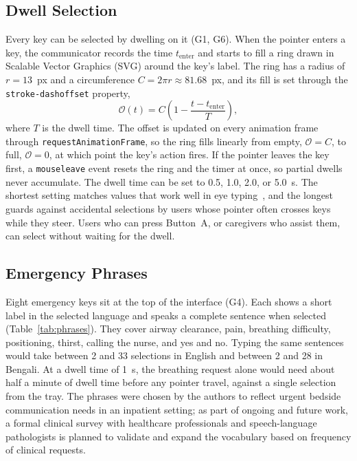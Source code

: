 \documentclass[journal]{IEEEtran}
\begin{document}
\subsection{Dwell Selection}
Every key can be selected by dwelling on it (G1, G6). When the pointer enters a key, the communicator records the time $t_{\mathrm{enter}}$ and starts to fill a ring drawn in Scalable Vector Graphics (SVG) around the key's label. The ring has a radius of $r=13$~px and a circumference $C=2\pi r\approx81.68$~px, and its fill is set through the \texttt{stroke-dashoffset} property,
\begin{equation}
\mathcal{O}(t)=C\left(1-\frac{t-t_{\mathrm{enter}}}{T}\right),
\label{eq:ring}
\end{equation}
where $T$ is the dwell time. The offset is updated on every animation frame through \texttt{requestAnimationFrame}, so the ring fills linearly from empty, $\mathcal{O}=C$, to full, $\mathcal{O}=0$, at which point the key's action fires. If the pointer leaves the key first, a \texttt{mouseleave} event resets the ring and the timer at once, so partial dwells never accumulate. The dwell time can be set to 0.5, 1.0, 2.0, or 5.0~s. The shortest setting matches values that work well in eye typing~\cite{helmert2008,burnham2025}, and the longest guards against accidental selections by users whose pointer often crosses keys while they steer. Users who can press Button~A, or caregivers who assist them, can select without waiting for the dwell.

\subsection{Emergency Phrases}
Eight emergency keys sit at the top of the interface (G4). Each shows a short label in the selected language and speaks a complete sentence when selected (Table~\ref{tab:phrases}). They cover airway clearance, pain, breathing difficulty, positioning, thirst, calling the nurse, and yes and no. Typing the same sentences would take between 2 and 33 selections in English and between 2 and 28 in Bengali. At a dwell time of 1~s, the breathing request alone would need about half a minute of dwell time before any pointer travel, against a single selection from the tray. The phrases were chosen by the authors to reflect urgent bedside communication needs in an inpatient setting; as part of ongoing and future work, a formal clinical survey with healthcare professionals and speech-language pathologists is planned to validate and expand the vocabulary based on frequency of clinical requests.
\end{document}

